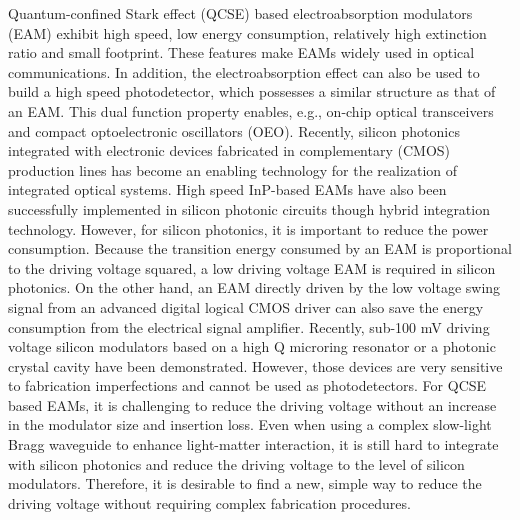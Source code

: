 \documentclass[aip,apl,preprint,a4paper]{revtex4-1}
\begin{document}

\maketitle %


Quantum-confined Stark effect (QCSE) based electroabsorption modulators (EAM) exhibit high speed, low energy consumption, relatively high extinction ratio and small footprint.\cite{Yong40,Fukano} These features make EAMs widely used in optical communications. In addition, the electroabsorption effect can also be used to build a high speed photodetector, which possesses a similar structure as that of an EAM.\cite{Welstand} This dual function property enables, e.g., on-chip optical transceivers \cite{Transceiver} and compact optoelectronic oscillators (OEO).\cite{Zhou} Recently, silicon photonics integrated with electronic devices fabricated in complementary (CMOS) production lines has become an enabling technology for the realization of integrated optical systems.\cite{Marpaung,Sun} High speed InP-based EAMs have also been successfully implemented in silicon photonic circuits though hybrid integration technology.\cite{Yong40,Transceiver,roelkensiii-v-on-silicon2015,fu52015} However, for silicon photonics, it is important to reduce the power consumption. Because the transition energy consumed by an EAM is proportional to the driving voltage squared,\cite{Yong40} a low driving voltage EAM is required in silicon photonics. On the other hand, an EAM directly driven by the low voltage swing signal from an advanced digital logical CMOS driver can also save the energy consumption from the electrical signal amplifier. Recently, sub-100 mV driving voltage silicon modulators based on a high Q microring resonator or a photonic crystal cavity have been demonstrated.\cite{Manipatruni,Shakoor:14} However, those devices are very sensitive to fabrication imperfections and cannot be used as photodetectors. For QCSE based EAMs, it is challenging to reduce the driving voltage without an increase in the modulator size and insertion loss. Even when using a complex slow-light Bragg waveguide to enhance light-matter interaction,\cite{gulow-voltage2013} it is still hard to integrate with silicon photonics and reduce the driving voltage to the level of silicon modulators. Therefore, it is desirable to find a new, simple way to reduce the driving voltage without requiring complex fabrication procedures.
\end{document}
